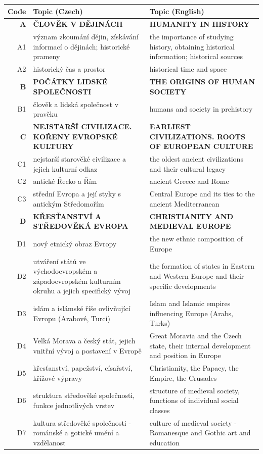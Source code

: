 \documentclass[]{interact}
\theoremstyle{plain}%
\theoremstyle{definition}
\theoremstyle{remark}
\begin{document}
\setcounter{table}{0}
\begin{table}
  {\begin{tabular}{r|p{10cm}|p{10cm}}

\textbf{Code} & \textbf{Topic (Czech)} & \textbf{Topic (English)} \\ \hline \hline
\textbf{A} & \textbf{ČLOVĚK V DĚJINÁCH} & \textbf{HUMANITY IN HISTORY} \\
A1 & význam zkoumání dějin, získávání informací o dějinách; historické prameny & the importance of studying history, obtaining historical information; historical sources \\ 
A2 & historický čas a prostor & historical time and space \\ \hline

\textbf{B} & \textbf{POČÁTKY LIDSKÉ SPOLEČNOSTI} & \textbf{THE ORIGINS OF HUMAN SOCIETY} \\ 
B1 & člověk a lidská společnost v pravěku & humans and society in prehistory \\ \hline

\textbf{C} & \textbf{NEJSTARŠÍ CIVILIZACE. KOŘENY EVROPSKÉ KULTURY} & \textbf{EARLIEST CIVILIZATIONS. ROOTS OF EUROPEAN CULTURE} \\ 
C1 & nejstarší starověké civilizace a jejich kulturní odkaz & the oldest ancient civilizations and their cultural legacy \\ 
C2 & antické Řecko a Řím & ancient Greece and Rome \\ 
C3 & střední Evropa a její styky s antickým Středomořím & Central Europe and its ties to the ancient Mediterranean \\ \hline

\textbf{D} & \textbf{KŘESŤANSTVÍ A STŘEDOVĚKÁ EVROPA} & \textbf{CHRISTIANITY AND MEDIEVAL EUROPE} \\
D1 & nový etnický obraz Evropy & the new ethnic composition of Europe \\ \hline
D2 & utváření států ve východoevropském a západoevropském kulturním okruhu a jejich specifický vývoj & the formation of states in Eastern and Western Europe and their specific developments \\ 
D3 & islám a islámské říše ovlivňující Evropu (Arabové, Turci) & Islam and Islamic empires influencing Europe (Arabs, Turks) \\ 
D4 & Velká Morava a český stát, jejich vnitřní vývoj a postavení v Evropě & Great Moravia and the Czech state, their internal development and position in Europe \\ 
D5 & křesťanství, papežství, císařství, křížové výpravy & Christianity, the Papacy, the Empire, the Crusades \\ 
D6 & struktura středověké společnosti, funkce jednotlivých vrstev & structure of medieval society, functions of individual social classes \\ 
D7 & kultura středověké společnosti - románské a gotické umění a vzdělanost & culture of medieval society - Romanesque and Gothic art and education \\ \hline


\end{tabular}}
\end{table}
\end{document}
